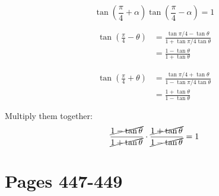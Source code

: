 \documentclass[fleqn,addpoints]{exam}
\begin{document}
\[
  \tan \left( \frac{\pi}{4} + \alpha \right)   \tan \left( \frac{\pi}{4} - \alpha \right) = 1
\]

\begin{solution}
\begin{align*}
  \tan \left( \frac{\pi}{4} - \theta \right) &= \frac{\tan \pi/4 - \tan \theta}{1 + \tan \pi/4 \tan \theta} \\
  &= \frac{1 - \tan \theta}{1 + \tan \theta}
\end{align*}

\begin{align*}
  \tan \left( \frac{\pi}{4} + \theta \right) &= \frac{\tan \pi/4 + \tan \theta}{1 - \tan \pi/4 \tan \theta} \\
  &= \frac{1 + \tan \theta}{1 - \tan \theta}
\end{align*}

Multiply them together:
\[
  \frac{\cancel{1 - \tan \theta}}{\cancel{1 + \tan \theta}} \cdot \frac{\cancel{1 + \tan \theta}}{\cancel{1 - \tan \theta}} = 1
\]

\end{solution}

\ifprintanswers
\section{Pages 447-449}
\end{document}
